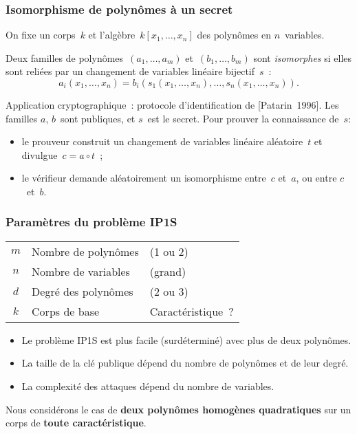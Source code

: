\documentclass{beamer}%
\def\strong#1{{\bf\color{rouge}#1}}
\def\emphz#1{\emph{{\color{bleu}#1}}}
\begin{document}
\begin{frame}
\titlepage
\end{frame}%
\begin{frame}\frametitle{Isomorphisme de polynômes à un secret}%
On fixe un corps~$k$ et l'algèbre~$k[x_1,…,x_n]$ des polynômes en
$n$~variables.

\begin{definition}
Deux familles de polynômes~$(a_1,…, a_m)$ et~$(b_1, …, b_m)$ sont
\emphz{isomorphes} si elles sont reliées par un changement de variables
linéaire bijectif~$s$ :
\[ a_i (x_1, …, x_n) = b_i (s_1 (x_1, …, x_n), …, s_n (x_1, …, x_n)). \]
\end{definition}

Application cryptographique : protocole d'identification de
[Patarin~1996]. Les familles $a$, $b$~sont publiques, et $s$~est le
secret. Pour prouver la connaissance de~$s$:
\begin{itemize}
\item le prouveur construit un changement de variables linéaire
aléatoire~$t$ et divulgue~$c = a ∘ t$ ;
\item le vérifieur demande aléatoirement un isomorphisme entre~$c$
et~$a$, ou entre $c$~et~$b$.
\end{itemize}
\end{frame}%
\begin{frame}\frametitle{Paramètres du problème IP1S}%

\begin{tabular}{cll}\toprule
\color{rouge} $m$ & Nombre de polynômes & (1 ou 2)\\
\color{rouge} $n$ & Nombre de variables & (grand) \\
\color{rouge} $d$ & Degré des polynômes & (2 ou 3) \\
\color{rouge} $k$ & Corps de base & Caractéristique ?\\
\bottomrule\end{tabular}

\bigskip
\begin{itemize}
\item Le problème IP1S est {plus facile} (surdéterminé) avec plus
de deux polynômes.
\item La taille de la clé publique dépend du nombre de polynômes et de
leur degré.
\item La complexité des attaques dépend du nombre de variables.
\end{itemize}

\bigskip
Nous considérons le cas de \strong{deux polynômes homogènes quadratiques}
sur un corps de \strong{toute caractéristique}.
\end{frame}%
\end{document}

